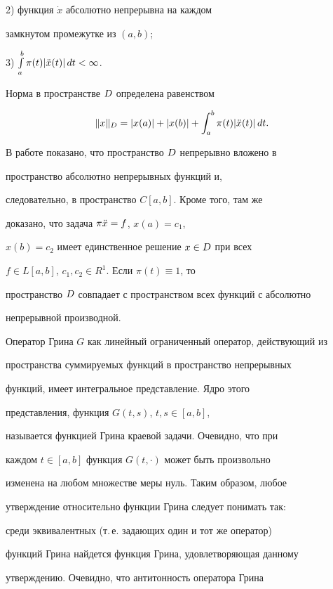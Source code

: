 2) функция $\Dot x$ абсолютно непрерывна на каждом


замкнутом промежутке из $(a,b)$;





3) $\int\limits_a^b\pi(t)|\Ddot x(t)|\,dt<\infty$.





Норма в пространстве $D$ определена равенством


$$


\|x\|_{\D}=|x(a)|+|x(b)|+\int_a^b\pi(t)|\Ddot x(t)|\,dt.


$$


В работе \cite{Lab} показано, что пространство $D$ непрерывно вложено в


пространство абсолютно непрерывных функций и,


следовательно, в пространство $C[a,b]$. Кроме того, там же


доказано, что задача $\pi\Ddot x=f$, $x(a)=c_1$,


$x(b)=c_2$ имеет единственное решение $x\in D$ при всех


$f\in L[a,b]$, $c_1, c_2\in R^1$. Если $\pi(t)\equiv1$, то


пространство $D$ совпадает с пространством всех функций с абсолютно


непрерывной производной.





Оператор Грина $G$ как линейный ограниченный оператор, действующий из


пространства суммируемых функций в пространство непрерывных


функций, имеет интегральное представление. Ядро этого


представления, функция $G(t,s)$, $t,s\in[a,b]$,


называется функцией Грина краевой задачи. Очевидно, что при


каждом $t\in[a,b]$ функция $G(t,\cdot)$ может быть произвольно


изменена на любом множестве меры нуль. Таким образом, любое


утверждение относительно функции Грина следует понимать так:


среди эквивалентных (т.\,е. задающих один и тот же оператор)


функций Грина найдется функция Грина, удовлетворяющая данному


утверждению. Очевидно, что антитонность оператора Грина



